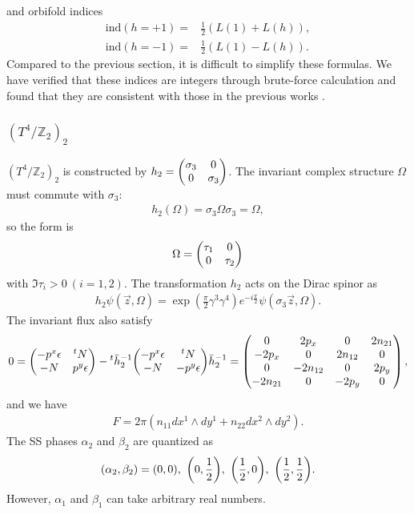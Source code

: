 \documentclass[11pt]{article}
\begin{document}
and orbifold indices
\begin{align}
    \text{ind}(h=+1)=&\frac{1}{2} (L(1)+ L(h)), \\
    \text{ind}(h=-1)=&\frac{1}{2} (L(1)- L(h)).
\end{align}
Compared to the previous section, it is difficult to simplify these formulas. We have verified that these indices are integers through brute-force calculation and found that they are consistent with those in the previous works \cite{Kikuchi:2022lfv}.


\subsubsection{ $(T^4/\mathbb{Z}_2)_2$}
$(T^4/\mathbb{Z}_2)_2$ is constructed by $h_2=\mqty(\sigma_3 & 0 \\ 0 & \sigma_3)$. The invariant complex structure $\Omega$ must commute with $\sigma_3$:
\begin{align}
    h_2(\Omega)=\sigma_3\Omega \sigma_3=\Omega,
\end{align}
so the form is 
\begin{align}
    \Omega=\mqty(\tau_1 & 0 \\ 0 & \tau_2)
\end{align}
with $\Im \tau_i>0~(i=1,2)$. The transformation $h_2$ acts on the Dirac spinor as
\begin{align}
    h_2 \psi(\vec{z}, \Omega)= \exp( \frac{\pi}{2} \gamma^3 \gamma^4)e^{-i\frac{\pi}{2}} \psi(\sigma_3 \vec{z},\Omega). 
\end{align}
The invariant flux also satisfy
\begin{align}
0=\mqty( -p^x\epsilon & {}^tN \\-N & p^y \epsilon)  - {}^t \bar{h}^{-1}_2\mqty( -p^x \epsilon& {}^tN \\-N &- p^y\epsilon ) \bar{h}^{-1}_2 =  \left(\begin{matrix}0 & 2 p_{x} & 0 & 2 n_{21}\\- 2 p_{x} & 0 & 2 n_{12} & 0\\0 & - 2 n_{12} & 0 & 2 p_{y}\\- 2 n_{21} & 0 & - 2 p_{y} & 0\end{matrix}\right),
\end{align}
and we have
\begin{align}
    F= 2\pi( n_{11} dx^1 \wedge dy^1 +n_{22} dx^2 \wedge dy^2) .
\end{align}
The SS phases $\alpha_2$ and $\beta_2$ are quantized as
\begin{align}
    (\alpha_2,\beta_2)=(0,0),~\qty(0,\frac{1}{2}),~\qty(\frac{1}{2},0),~\qty(\frac{1}{2},\frac{1}{2}). 
\end{align}
However, $\alpha_1$ and $\beta_1$ can take arbitrary real numbers.
\end{document}
